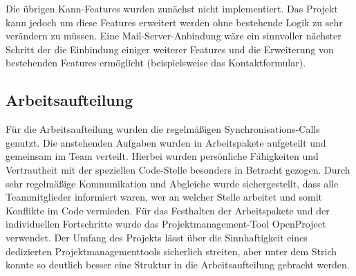 Die übrigen Kann-Features wurden zunächst nicht implementiert. Das Projekt kann jedoch um diese Features erweitert werden ohne bestehende Logik zu sehr verändern zu müssen. Eine Mail-Server-Anbindung wäre ein sinnvoller nächster Schritt der die Einbindung einiger weiterer Features und die Erweiterung von bestehenden Features ermöglicht (beispielsweise das Kontaktformular).

\subsection{Arbeitsaufteilung}
\label{Arbeitsaufteilung}

Für die Arbeitsaufteilung wurden die regelmäßigen Synchronisations-Calls genutzt. Die anstehenden Aufgaben wurden in Arbeitspakete aufgeteilt und gemeinsam im Team verteilt. Hierbei wurden persönliche Fähigkeiten und Vertrautheit mit der speziellen Code-Stelle besonders in Betracht gezogen. Durch sehr regelmäßige Kommunikation und Abgleiche wurde sichergestellt, dass alle Teammitglieder informiert waren, wer an welcher Stelle arbeitet und somit Konflikte im Code vermieden.
Für das Festhalten der Arbeitspakete und der individuellen Fortschritte wurde das Projektmanagement-Tool OpenProject verwendet. Der Umfang des Projekts lässt über die Sinnhaftigkeit eines dedizierten Projektmanagementtools sicherlich streiten, aber unter dem Strich konnte so deutlich besser eine Struktur in die Arbeitsaufteilung gebracht werden. \\